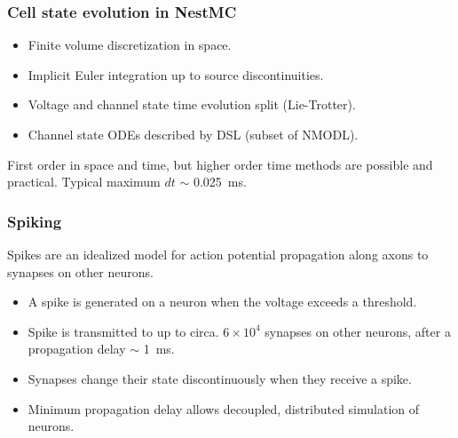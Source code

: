 \documentclass[aspectratio=43,12pt]{beamer}
\newcommand{\nestmc}{NestMC}
\begin{document}
\begin{frame}
\frametitle{Cell state evolution in \nestmc{}}

\begin{itemize}
\item Finite volume discretization in space.
\item Implicit Euler integration up to source discontinuities.
\item Voltage and channel state time evolution split (Lie-Trotter).
\item Channel state ODEs described by DSL (subset of NMODL).
\end{itemize}
\vfill
First order in space and time, but higher order time methods are possible and practical.
\vfill
Typical maximum $dt$ $\sim$ 0.025\ ms.
\vfill
\end{frame}

\begin{frame}
\frametitle{Spiking}

Spikes are an idealized model for action potential propagation along axons to
synapses on other neurons.
\vfill
\begin{itemize}
\item A spike is generated on a neuron when the voltage exceeds a threshold.
\item Spike is transmitted to up to circa. $6\times10^4$ synapses on other neurons,
after a propagation delay $\sim$ 1\ ms.
\item Synapses change their state discontinuously when they receive a spike.
\item Minimum propagation delay allows decoupled, distributed simulation
of neurons.
\end{itemize}
\end{frame}
\end{document}
